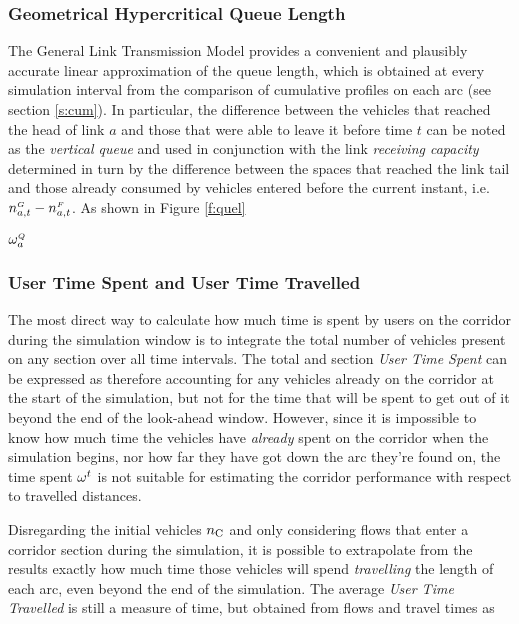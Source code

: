 \subsubsection{Geometrical Hypercritical Queue Length}
The General Link Transmission Model provides a convenient and plausibly accurate linear approximation of the queue length, which is obtained at every simulation interval from the comparison of cumulative profiles on each arc (see section \ref{s:cum}). In particular, the difference between the vehicles that reached the head of link $a$ and those that were able to leave it before time $t$ can be noted as the \emph{vertical queue}
and used in conjunction with the link \emph{receiving capacity} determined in turn by the difference between the spaces that reached the link tail and those already consumed by vehicles entered before the current instant, i.e. $n_{a,t}^{\scriptscriptstyle{G}} - n_{a,t}^{\scriptscriptstyle{F}}$. As shown in Figure \ref{f:quel} 




$\omega_{a}^{\scriptscriptstyle{Q}}$

\subsubsection*{User Time Spent and User Time Travelled}
The most direct way to calculate how much time is spent by users on the corridor during the simulation window is to integrate the total number of vehicles present on any section over all time intervals. The total and section \emph{User Time Spent} can be expressed as
therefore accounting for any vehicles already on the corridor at the start of the simulation, but not for the time that will be spent to get out of it beyond the end of the look-ahead window.
However, since it is impossible to know how much time the vehicles have \emph{already} spent on the corridor when the simulation begins, nor how far they have got down the arc they're found on, the time spent $\omega_{}^{t}$ is not suitable for estimating the corridor performance with respect to travelled distances. 

Disregarding the initial vehicles $n_{\mathrm{C}}$ and only considering flows that enter a corridor section during the simulation, it is possible to extrapolate from the results exactly how much time those vehicles will spend \emph{travelling} the length of each arc, even beyond the end of the simulation. The average \emph{User Time Travelled} is still a measure of time, but obtained from flows and travel times as



